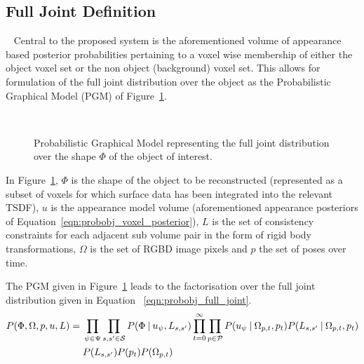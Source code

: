 \subsection{Full Joint Definition}
~\label{subsec:probobj_full_joint}
Central to the proposed system is the aforementioned volume of appearance based
posterior probabilities pertaining to a voxel wise membership of either the
object voxel set or the non object (background) voxel set. This allows for
formulation of the full joint distribution over the object as the Probabilistic
Graphical Model (PGM) of Figure~\ref{figure:probobj_pgm1}.
\begin{figure}[!htbp]
  \centering
  \caption[Probabilistic Object Reconstruction Formulation I]
  {Probabilistic Graphical Model representing the full joint
    distribution over the shape \( \Phi \) of the object of interest.}
~\label{figure:probobj_pgm1}
\end{figure}

In Figure~\ref{figure:probobj_pgm1}, \( \Phi \) is the shape of the object to be 
reconstructed (represented as a subset of voxels for which surface data has been 
integrated into the relevant TSDF), \(u\) is the appearance model volume (aforementioned 
appearance posteriors of Equation~\ref{eqn:probobj_voxel_posterior}), \(L\) is the set 
of consistency constraints for each adjacent sub volume pair in the form of rigid body 
transformations, \( \Omega \) is the set of RGBD image pixels and \(p\) the set of 
poses over time.

The PGM given in Figure~\ref{figure:probobj_pgm1} leads to the
factorisation over the full joint distribution given in Equation
~\ref{eqn:probobj_full_joint}.
\begin{equation}
  \label{eqn:probobj_full_joint}
  \begin{split}
    P(\Phi, \Omega, p, u, L) ={}&
    \prod_{\psi \in \Psi}\prod_{s, s' \in \mathcal{S}}
    P(\Phi \:\vert\: u_{\psi}, L_{s, s'}) 
    \prod_{t=0}^{\infty}\prod_{p \in \mathcal{P}}
    P(u_{\psi} \:\vert\: \Omega_{p, t}, p_{t})
    P(L_{s, s'} \:\vert\: \Omega_{p, t}, p_{t})\\
    & P(L_{s, s'})P(p_{t})P(\Omega_{p, t})
  \end{split}
\end{equation}

